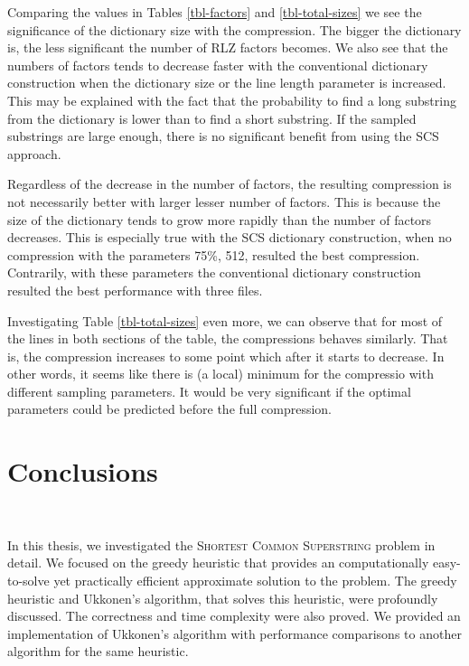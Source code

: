 \documentclass[english,twoside,censored,csm,algorithms-track-2020]{HYthesisML}
\theoremstyle{plain}
\theoremstyle{definition}
\begin{document}
Comparing the values in Tables \ref{tbl-factors} and \ref{tbl-total-sizes} we see the significance
of the dictionary size with the compression. The bigger the dictionary is, the less significant the
number of RLZ factors becomes. We also see that the numbers of factors tends to decrease faster
with the conventional dictionary construction when the dictionary size or the line length parameter
is increased. This may be explained with the fact that the probability to find a long substring from
the dictionary is lower than to find a short substring. If the sampled substrings are large enough,
there is no significant benefit from using the SCS approach.

Regardless of the decrease in the number of factors, the resulting compression is not necessarily
better with larger lesser number of factors. This is because the size of the dictionary tends to grow more
rapidly than the number of factors decreases. This is especially true with the SCS dictionary
construction, when no compression with the parameters 75\%, 512, resulted the best compression.
Contrarily, with these parameters the conventional dictionary construction resulted the best
performance with three files.

Investigating Table \ref{tbl-total-sizes} even more, we can observe that for most of the lines
in both sections of the table, the compressions behaves similarly. That is, the compression
increases to some point which after it starts to decrease. In other words, it seems like
there is (a local) minimum for the compressio with different sampling parameters.
It would be very significant if the optimal parameters could be predicted before the full compression.


\chapter{Conclusions}~\label{chp-conc}

In this thesis, we investigated the \textsc{Shortest Common Superstring} problem
in detail. We focused on the greedy heuristic that provides an computationally
easy-to-solve yet practically efficient approximate solution to the problem.
The greedy heuristic and Ukkonen's algorithm, that solves this heuristic,
were profoundly discussed. The correctness and time complexity were also proved.
We provided an implementation of Ukkonen's algorithm with performance
comparisons to another algorithm for the same heuristic.
\end{document}
